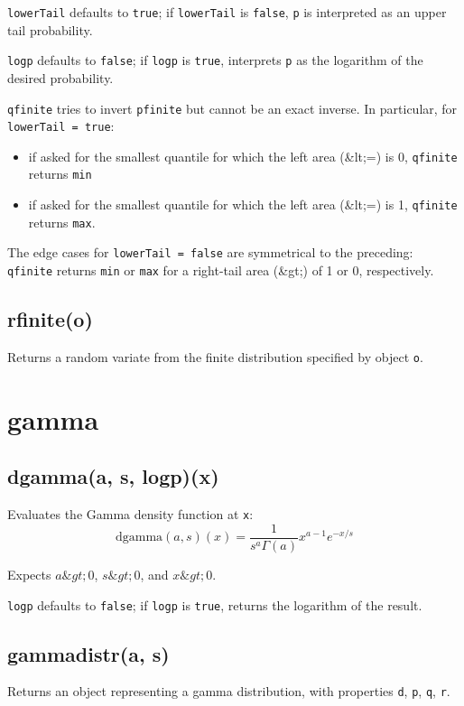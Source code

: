 \documentclass{article}
\begin{document}
\texttt{lowerTail} defaults to \texttt{true}; if \texttt{lowerTail} is \texttt{false}, \texttt{p} is
interpreted as an upper tail probability.


\texttt{logp} defaults to \texttt{false}; if \texttt{logp} is \texttt{true}, interprets \texttt{p} as
the logarithm of the desired probability.


\texttt{qfinite} tries to invert \texttt{pfinite} but cannot be an exact inverse.
In particular, for \texttt{lowerTail = true}:


\begin{itemize}

\item if asked for the smallest quantile for which the left area (\&lt;=) is 0, \texttt{qfinite} returns
\texttt{min}

\item if asked for the smallest quantile for which the left area (\&lt;=) is 1,
\texttt{qfinite} returns \texttt{max}.

\end{itemize}

The edge cases for \texttt{lowerTail = false} are symmetrical to the preceding:
\texttt{qfinite} returns \texttt{min} or \texttt{max} for a right-tail area (\&gt;) of 1 or 0, respectively.


    \subsection*{rfinite(o)}
    Returns a random variate from the finite distribution
specified by object \texttt{o}.


  \section{gamma}
    \subsection*{dgamma(a, s, logp)(x)}
    Evaluates the Gamma density function at \texttt{x}:
$$\textrm{dgamma}(a, s)(x) = \frac{1}{s^a\Gamma(a)}x^{a-1}e^{-x/s}$$


Expects $a \&gt; 0$, $s \&gt; 0$, and $x \&gt; 0$.


\texttt{logp} defaults to \texttt{false}; if \texttt{logp} is \texttt{true}, returns the
logarithm of the result.


    \subsection*{gammadistr(a, s)}
    Returns an object representing a gamma distribution, with properties \texttt{d}, \texttt{p}, \texttt{q}, \texttt{r}.
\end{document}
